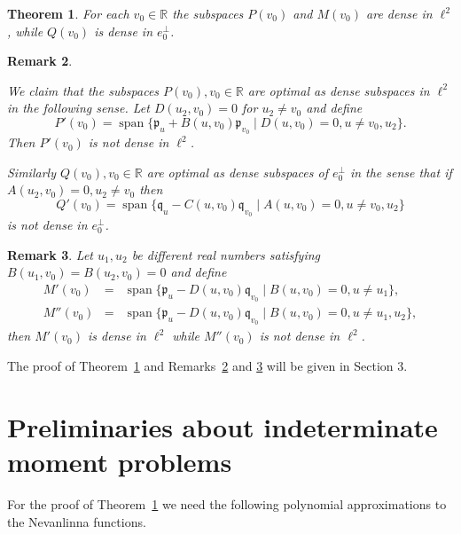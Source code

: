 \documentclass [12pt]{article}
\DeclareMathOperator{\spn}{span}
\newtheorem{thm}{Theorem}[section]
\newtheorem{rem}[thm]{Remark}
\newcommand{\R}{\mathbb{R}}
\begin{document}
  \begin{thm}\label{thm:concrete} For each $v_0\in\R$ the subspaces $P(v_0)$ and $M(v_0)$ are dense in $\ell^2$, while $Q(v_0)$ is dense in $e_0^\perp$.
\end{thm}

\begin{rem}\label{thm:optimal1}
{\rm We claim that the subspaces $P(v_0), v_0\in \R$ are optimal as dense subspaces in $\ell^2$ in the following sense. Let $D(u_2,v_0)=0$ for $u_2\neq v_0$ and define
\begin{equation}\label{eq:P'} 
P'(v_0)=\spn\{\mathfrak{p}_u+B(u,v_0)\mathfrak{p}_{v_0} \mid D(u,v_0)=0, u\neq v_0,u_2\}.
\end{equation}
Then $P'(v_0)$ is not dense in $\ell^2$.

Similarly $Q(v_0), v_0\in\R$ are optimal as  dense subspaces of $e_0^\perp$ in the sense that if $A(u_2,v_0)=0, u_2\neq v_0$ then
\begin{equation}\label{eq:Q'} 
Q'(v_0)=\spn\{\mathfrak{q}_u-C(u,v_0)\mathfrak{q}_{v_0} \mid A(u,v_0)=0, u\neq v_0,u_2\}
\end{equation}
is not dense in $e_0^\perp$.
}
\end{rem}

\begin{rem}\label{thm:optimal2}
{\rm Let $u_1,u_2$ be different real numbers satisfying $B(u_1,v_0)=B(u_2,v_0)=0$ and define
\begin{eqnarray} 
M'(v_0)&=&\spn\{\mathfrak{p}_u-D(u,v_0)\mathfrak{q}_{v_0} \mid B(u,v_0)=0, u\neq u_1\},\label{eq:M'}\\
M''(v_0)&=&\spn\{\mathfrak{p}_u-D(u,v_0)\mathfrak{q}_{v_0} \mid B(u,v_0)=0, u\neq u_1, u_2\},\label{eq:M''}
\end{eqnarray}
then $M'(v_0)$ is dense in $\ell^2$ while $M''(v_0)$ is not dense in $\ell^2$.
}
\end{rem}


The proof of Theorem~\ref{thm:concrete} and  Remarks~\ref{thm:optimal1} and \ref{thm:optimal2}  will be given in Section 3.





\section{Preliminaries about indeterminate moment problems}

For the proof of Theorem~\ref{thm:concrete} we need the following polynomial approximations to the Nevanlinna functions.
 
\end{document}
